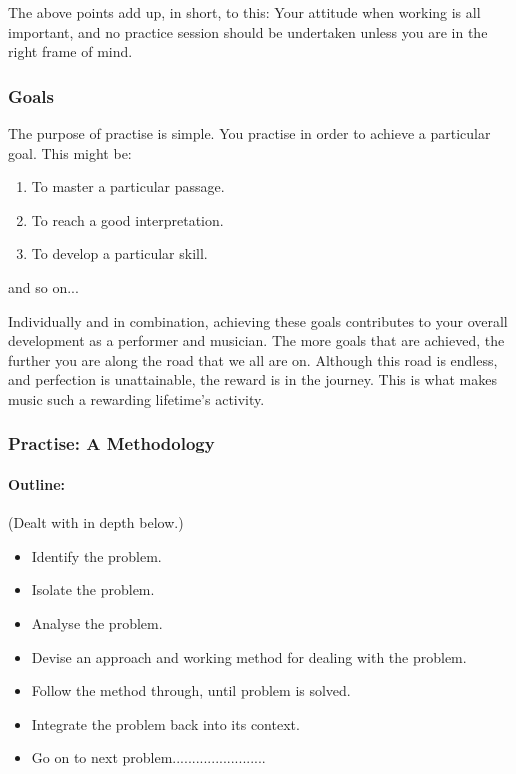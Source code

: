 \documentclass{article}
\begin{document}
The above points add up, in short, to this: Your attitude when working is all important, and no practice session should be undertaken unless you are in the right frame of mind.

\subsubsection{Goals}

The purpose of practise is simple.
You practise in order to achieve a particular goal.
This might be:

\begin{enumerate}
    \item To master a particular passage.
    \item To reach a good interpretation.
    \item To develop a particular skill.
\end{enumerate}
and so on...

Individually and in combination, achieving these goals contributes to your overall development as a performer and musician.
The more goals that are achieved, the further you are along the road that we all are on.
Although this road is endless, and perfection is unattainable, the reward is in the journey.
This is what makes music such a rewarding lifetime's activity.

\subsubsection{Practise: A Methodology}

\paragraph{Outline:} (Dealt with in depth below.)
\begin{itemize}
    \item Identify the problem.
    \item Isolate the problem.
    \item Analyse the problem.
    \item Devise an approach and working method for dealing with the problem.
    \item Follow the method through, until problem is solved.
    \item Integrate the problem back into its context.
    \item Go on to next problem........................
\end{itemize}
\end{document}
